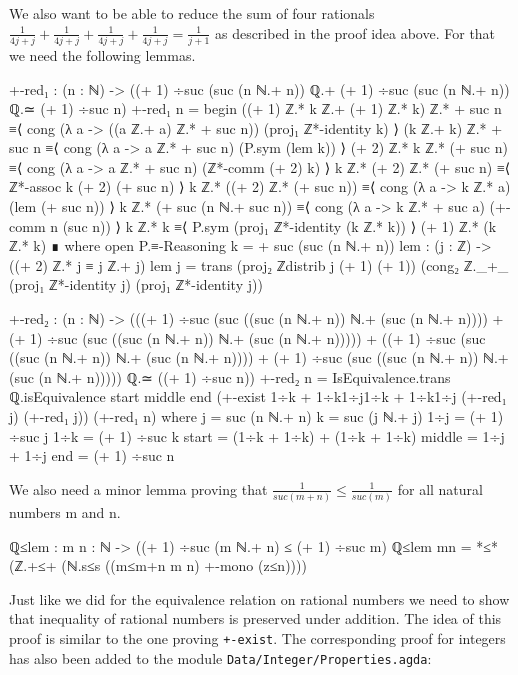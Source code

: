 \documentclass[11pt,a4paper]{article}
\begin{document}
We also want to be able to reduce the sum of four rationals $\frac{1}{4j + j} + \frac{1}{4j + j} + \frac{1}{4j + j} + \frac{1}{4j + j} = \frac{1}{j +1}$ as described in the proof idea above. For that we need the following lemmas.
\begin{code}
+-red₁ : (n : ℕ) -> 
  ((+ 1) ÷suc (suc (n ℕ.+ n)) ℚ.+ 
  (+ 1) ÷suc (suc (n ℕ.+ n)) ℚ.≃ (+ 1) ÷suc n)
+-red₁ n = begin 
  ((+ 1) ℤ.* k ℤ.+ (+ 1) ℤ.* k) ℤ.* + suc n 
  ≡⟨ cong (λ a -> ((a ℤ.+ a) ℤ.* + suc n)) (proj₁ ℤ*-identity k) ⟩
  (k ℤ.+ k) ℤ.* + suc n 
  ≡⟨ cong (λ a -> a ℤ.* + suc n) (P.sym (lem k)) ⟩
  (+ 2) ℤ.* k ℤ.* (+ suc n) 
  ≡⟨ cong (λ a -> a ℤ.* + suc n) (ℤ*-comm (+ 2) k) ⟩
  k ℤ.* (+ 2) ℤ.* (+ suc n) 
  ≡⟨ ℤ*-assoc k (+ 2) (+ suc n) ⟩
  k ℤ.* ((+ 2) ℤ.* (+ suc n)) 
  ≡⟨ cong (λ a -> k ℤ.* a) (lem (+ suc n)) ⟩
  k ℤ.* (+ suc (n ℕ.+ suc n)) 
  ≡⟨ cong (λ a -> k ℤ.* + suc a) (+-comm n (suc n)) ⟩
  k ℤ.* k ≡⟨ P.sym (proj₁ ℤ*-identity (k ℤ.* k)) ⟩
  (+ 1) ℤ.* (k ℤ.* k)
  ∎
    where
      open P.≡-Reasoning
      k = + suc (suc (n ℕ.+ n))
      lem : (j : ℤ) -> ((+ 2) ℤ.* j ≡ j ℤ.+ j)
      lem j = trans (proj₂ ℤdistrib j (+ 1) (+ 1)) 
        (cong₂ ℤ._+_ (proj₁ ℤ*-identity j) (proj₁ ℤ*-identity j)) 

+-red₂ : (n : ℕ) -> 
       (((+ 1) ÷suc (suc ((suc (n ℕ.+ n)) ℕ.+ (suc (n ℕ.+ n)))) +
       (+ 1) ÷suc (suc ((suc (n ℕ.+ n)) ℕ.+ (suc (n ℕ.+ n))))) 
      + 
      ((+ 1) ÷suc (suc ((suc (n ℕ.+ n)) ℕ.+ (suc (n ℕ.+ n)))) +
      (+ 1) ÷suc (suc ((suc (n ℕ.+ n)) ℕ.+ (suc (n ℕ.+ n))))) 
      ℚ.≃ ((+ 1) ÷suc n))
+-red₂ n = IsEquivalence.trans ℚ.isEquivalence {start} {middle} {end} 
  (+-exist {1÷k + 1÷k}{1÷j}{1÷k + 1÷k}{1÷j} (+-red₁ j) (+-red₁ j)) 
    (+-red₁ n)
  where
    j = suc (n ℕ.+ n)
    k = suc (j ℕ.+ j)
    1÷j = (+ 1) ÷suc j
    1÷k = (+ 1) ÷suc k
    start = (1÷k + 1÷k) + (1÷k + 1÷k)
    middle = 1÷j + 1÷j
    end = (+ 1) ÷suc n
\end{code}
We also need a minor lemma proving that $\frac{1}{suc (m + n)} \leq \frac{1}{suc (m)}$ for all natural numbers m and n.
\begin{code}
ℚ≤lem : {m n : ℕ} -> ((+ 1) ÷suc (m ℕ.+ n) ≤ (+ 1) ÷suc m)
ℚ≤lem {m}{n} =  *≤* (ℤ.+≤+ (ℕ.s≤s ((m≤m+n m n) +-mono (z≤n))))
\end{code}
Just like we did for the equivalence relation on rational numbers we need to show that inequality of rational numbers is preserved under addition. The idea of this proof is similar to the one proving \texttt{+-exist}. The corresponding proof for integers has also been added to the module \texttt{Data/Integer/Properties.agda}:
\end{document}
